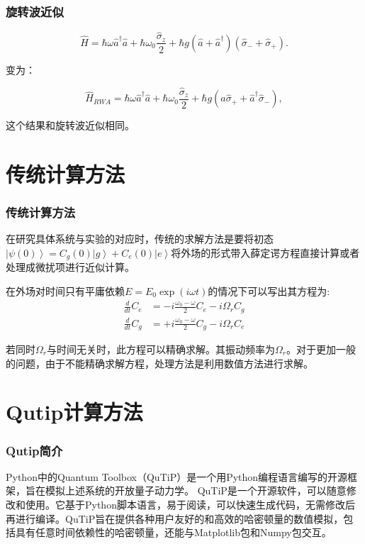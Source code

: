 \documentclass[aspectratio=169, 12pt]{beamer}
\begin{document}
\begin{frame}
    \frametitle{旋转波近似}
    \begin{equation}
        \hat{H}=\hbar \omega \hat{a}^{\dagger} \hat{a}+\hbar \omega_{0} \frac{\hat{\sigma}_{z}}{2}+\hbar g\left(\hat{a} +\hat{a}^{\dagger} \right)\left(\hat{\sigma}_{-}+\hat{\sigma}_{+}\right).
    \end{equation}

    变为：

    \begin{equation}
        \hat{H}_{RWA}=\hbar \omega \hat{a}^{\dagger} \hat{a}+\hbar \omega_{0} \frac{\hat{\sigma}_{z}}{2}+\hbar g\left(\hat{a}\hat{\sigma}_{+} +\hat{a}^{\dagger}\hat{\sigma}_{-} \right),
        \label{equ:H-RWA}
    \end{equation}

    这个结果和旋转波近似\cite{wu_strong-coupling_2007}相同。

\end{frame}

\section{传统计算方法}
\begin{frame}[shrink]
    \frametitle{传统计算方法}
    在研究具体系统与实验的对应时，传统的求解方法是要将初态$\left|\psi(0)\right> = C_g(0)\left|g\right> + C_e(0)\left|e\right>$将外场的形式带入薛定谔方程直接计算或者处理成微扰项进行近似计算。

    在外场对时间只有平庸依赖$E = E_0 \exp(i\omega t)$的情况下可以写出其方程为:
    \begin{equation}
        \begin{aligned}
            \frac{d}{d t} C_{e} & =-i \frac{\omega_{0}-\omega}{2} C_{e}-i \Omega_{r} C_{g} \\
            \frac{d}{d t} C_{g} & =+i \frac{\omega_{0}-\omega}{2} C_{g}-i \Omega_{r} C_{e}
        \end{aligned}
    \end{equation}

    若同时$\Omega_r$与时间无关时，此方程可以精确求解。其振动频率为$\Omega_r$。对于更加一般的问题，由于不能精确求解方程，处理方法是利用数值方法进行求解。

\end{frame}
\section{Qutip计算方法}
\begin{frame}
    \frametitle{Qutip简介}
    Python中的Quantum Toolbox（QuTiP）是一个用Python编程语言编写的开源框架\cite{johansson_qutip_2012}\cite{johansson_qutip_2013}，旨在模拟上述系统的开放量子动力学。
    QuTiP是一个开源软件，可以随意修改和使用。它基于Python脚本语言，易于阅读，可以快速生成代码，无需修改后再进行编译。QuTiP旨在提供各种用户友好的和高效的哈密顿量的数值模拟，包括具有任意时间依赖性的哈密顿量，还能与Matplotlib包和Numpy包交互。

\end{frame}
\end{document}
